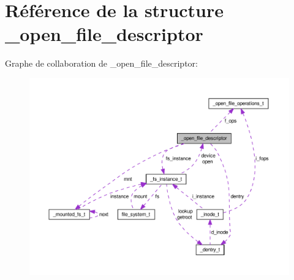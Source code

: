 \hypertarget{struct__open__file__descriptor}{\section{\-Référence de la structure \-\_\-open\-\_\-file\-\_\-descriptor}
\label{struct__open__file__descriptor}
}


\-Graphe de collaboration de \-\_\-open\-\_\-file\-\_\-descriptor\-:\nopagebreak
\begin{figure}[H]
\begin{center}
\leavevmode
\includegraphics[width=350pt]{struct__open__file__descriptor__coll__graph}
\end{center}
\end{figure}
